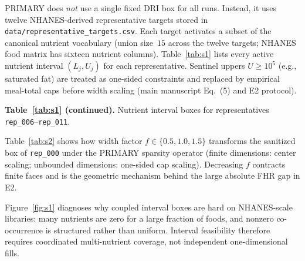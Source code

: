 \documentclass[lettersize,journal,onecolumn]{IEEEtran}
\begin{document}
PRIMARY does \emph{not} use a single fixed DRI box for all runs.
Instead, it uses twelve NHANES-derived representative targets stored in
\texttt{data/representative\_targets.csv}.
Each target activates a subset of the canonical nutrient vocabulary
(union size~$15$ across the twelve targets; NHANES food matrix has sixteen nutrient columns).
Table~\ref{tab:s1} lists every active nutrient interval $(L_j,U_j)$ for each representative.
Sentinel uppers $U\!\ge\!10^{5}$ (e.g., saturated fat) are treated as one-sided constraints and replaced by
empirical meal-total caps before width scaling (main manuscript Eq.~(5) and E2 protocol).

\begin{table}[!t]
\centering
\caption{Complete nutrient interval boxes for PRIMARY representatives \texttt{rep\_000}--\texttt{rep\_005}.
Values are taken verbatim from \texttt{target\_json}; $U=10^{7}$-scale entries denote sentinel/one-sided uppers.
Representatives \texttt{rep\_006}--\texttt{rep\_011} appear immediately below as a non-floating continuation.}
\label{tab:s1}
\scriptsize

\end{table}

\noindent\textbf{Table~\ref{tab:s1} (continued).}
Nutrient interval boxes for representatives \texttt{rep\_006}--\texttt{rep\_011}.\\[0.4em]
{\centering\scriptsize\par}

Table~\ref{tab:s2} shows how width factor $f\in\{0.5,1.0,1.5\}$ transforms the sanitized box of
\texttt{rep\_000} under the PRIMARY sparsity operator (finite dimensions: center scaling;
unbounded dimensions: one-sided cap scaling).
Decreasing $f$ contracts finite faces and is the geometric mechanism behind the large absolute FHR gap in E2.

\begin{table}[!t]
\centering
\caption{Sparsity scaling example for \texttt{rep\_000}.
Columns $L^{0},U^{0}$ are the sanitized reference box at $f=1.0$;
$L(f),U(f)$ are the PRIMARY operator outputs at $f=0.5$ and $f=1.5$.
Caps for sentinel dimensions use the E2 sanitization rule (not a hand-tuned DRI table).}
\label{tab:s2}
\scriptsize

\end{table}

Figure~\ref{fig:s1} diagnoses why coupled interval boxes are hard on NHANES-scale libraries:
many nutrients are zero for a large fraction of foods, and nonzero co-occurrence is structured rather than uniform.
Interval feasibility therefore requires coordinated multi-nutrient coverage, not independent one-dimensional fills.
\end{document}
